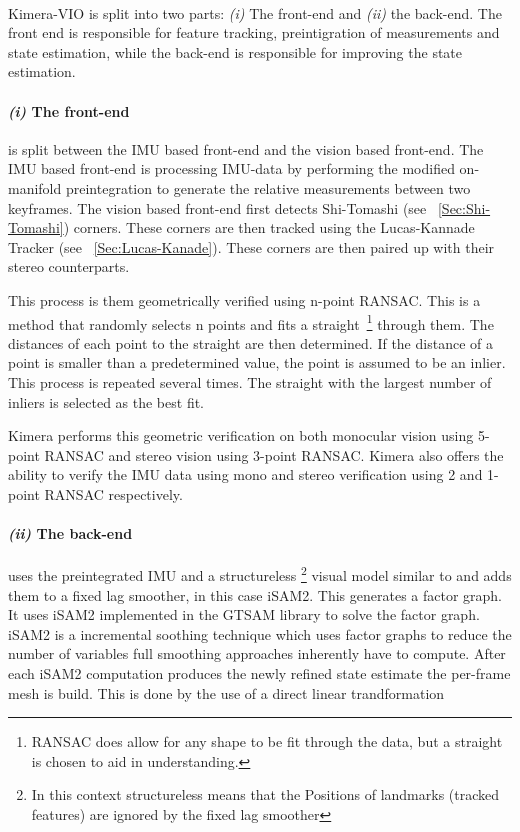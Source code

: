 \documentclass[11pt,a4paper]{article}
\begin{document}
\paragraph{}
Kimera-VIO is split into two parts: \textit{(i)} The front-end and \textit{(ii)} the back-end. 
The front end is responsible for feature tracking, preintigration of measurements and state estimation, while the back-end is responsible for improving the state estimation. 
\paragraph{\textit{(i)} The front-end}\label{para:geometric verification} 

is split between the IMU based front-end and the vision based front-end.
The IMU based front-end is processing IMU-data by performing the modified on-manifold preintegration to generate the relative measurements between two keyframes. 
The vision based front-end first detects Shi-Tomashi (see ~\ref{Sec:Shi-Tomashi}) corners. 
These corners are then tracked using the Lucas-Kannade Tracker \cite{lucas1981iterative} (see ~\ref{Sec:Lucas-Kanade}). 
These corners are then paired up with their stereo counterparts.

This process is them geometrically verified using n-point RANSAC. 
This is a method that randomly selects n points and fits a straight~\footnote{RANSAC does allow for any shape to be fit through the data, but a straight is chosen to aid in understanding.} through them.
The distances of each point to the straight are then determined.
If the distance of a point is smaller than a predetermined value, the point is assumed to be an inlier. 
This process is repeated several times. 
The straight with the largest number of inliers is selected as the best fit.

Kimera performs this geometric verification on both monocular vision using 5-point RANSAC and stereo vision using 3-point RANSAC.
Kimera also offers the ability to verify the IMU data using mono and stereo verification using 2 and 1-point RANSAC respectively.

\paragraph{\textit{(ii)} The back-end}
uses the preintegrated IMU and a structureless \footnote{In this context structureless means that the Positions of landmarks (tracked features) are ignored by the fixed lag smoother} visual model similar to \cite{Forster_2017} and adds them to a fixed lag smoother, in this case iSAM2. 
This generates a factor graph. It uses iSAM2 implemented in the GTSAM library to solve the factor graph. 
iSAM2 is a incremental soothing technique which uses factor graphs to reduce the number of variables full smoothing approaches inherently have to compute. 
After each iSAM2 computation produces the newly refined state estimate the per-frame mesh is build.
This is done by the use of a direct linear trandformation
\end{document}
